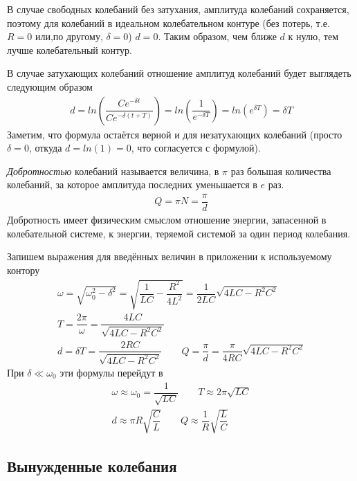 \documentclass[a4paper, usenames, dvipsnames]{article}
\begin{document}
В случае свободных колебаний без затухания, амплитуда колебаний сохраняется,
поэтому для колебаний в идеальном колебательном контуре
(без потерь, т.е. $R = 0$ или,по другому, $\delta = 0$) $d = 0$.
Таким образом, чем ближе $d$ к нулю, тем лучше колебательный контур.

В случае затухающих колебаний отношение амплитуд колебаний будет выглядеть
следующим образом
\begin{gather*}
    d = ln\left(\dfrac{C e^{-\delta t}}{C e^{-\delta (t + T)}}\right) = ln\left(\dfrac{1}{e^{-\delta T}}\right) = ln\left(e^{\delta T}\right) = \delta T
\end{gather*}
Заметим, что формула остаётся верной и для незатухающих колебаний (просто $\delta = 0$, откуда $d = ln(1) = 0$, что согласуется с формулой).

    {\it Добротностью} колебаний называется величина, в $\pi$ раз большая количества колебаний,
за которое амплитуда последних уменьшается в $e$ раз.
\begin{gather*}
    Q = \pi N = \dfrac{\pi}{d}
\end{gather*}
Добротность имеет физическим смыслом отношение энергии,
запасенной в колебательной системе, к энергии,
теряемой системой за один период колебания.

Запишем выражения для введённых величин в приложении к используемому контору
\begin{gather*}
    \omega = \sqrt{\omega_0^2 - \delta^2} = \sqrt{\dfrac{1}{LC} - \dfrac{R^2}{4L^2}} = \dfrac{1}{2LC}\sqrt{4LC - R^2C^2} \\
    T = \dfrac{2\pi}{\omega} = \dfrac{4LC}{\sqrt{4LC - R^2C^2}} \\
    d = \delta T = \dfrac{2RC}{\sqrt{4LC - R^2C^2}} \hspace{2em} Q = \dfrac{\pi}{d} = \dfrac{\pi}{4RC} \sqrt{4LC - R^2C^2}
\end{gather*}
При $\delta \ll \omega_0$
эти формулы перейдут в
\begin{gather*}
    \omega \approx \omega_0 = \dfrac{1}{\sqrt{LC}} \hspace{2em} T \approx 2\pi\sqrt{LC} \\
    d \approx \pi R \sqrt{\dfrac{C}{L}} \hspace{2em} Q \approx \dfrac{1}{R} \sqrt{\dfrac{L}{C}}
\end{gather*}

\subsection*{Вынужденные колебания}
\end{document}
